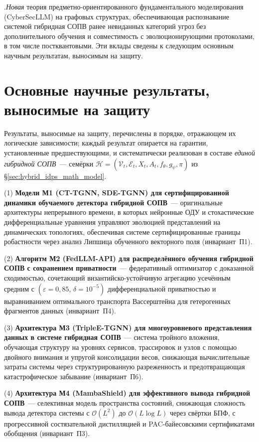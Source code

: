 .\quad \emph{Новая} теория предметно-ориентированного
фундаментального моделирования (CyberSecLLM) на графовых структурах,
обеспечивающая распознавание системой гибридная СОПВ ранее невиданных
категорий угроз без дополнительного обучения и совместимость с
эволюционирующими протоколами, в том числе постквантовыми. Эти
вклады сведены к следующим основным научным результатам, выносимым
на защиту.

\section*{Основные научные результаты, выносимые на защиту}

Результаты, выносимые на защиту, перечислены в порядке, отражающем
их логические зависимости; каждый результат опирается на гарантии,
установленные предшествующими, и систематически реализован в
составе \emph{единой гибридной СОПВ}~--- семёрки
$\mathcal{H}=(\mathcal{V}_t,\mathcal{E}_t,X_t,A_t,f_\theta,g_\psi,\pi)$
из \S\ref{sec:hybrid_idps_math_model}.

(1) \textbf{Модели М1 (CT-TGNN, SDE-TGNN) для сертифицированной
динамики обучаемого детектора гибридной СОПВ}~--- оригинальные
архитектуры непрерывного времени, в которых нейронные ОДУ и
стохастические дифференциальные уравнения управляют эволюцией
представлений на динамических топологиях, обеспечивая системе
сертифицированные границы робастности через анализ Липшица
обученного векторного поля (инвариант~П1).

(2) \textbf{Алгоритм М2 (FedLLM-API) для распределённого обучения
гибридной СОПВ с сохранением приватности}~--- федеративный
оптимизатор с доказанной сходимостью, сочетающий византийско-устойчивую
агрегацию усечённым средним с $(\varepsilon{=}0{,}85,\,\delta{=}10^{-5})$
дифференциальной приватностью и выравниванием оптимального транспорта
Вассерштейна для гетерогенных фрагментов данных (инвариант~П4).

(3) \textbf{Архитектура М3 (TripleE-TGNN) для многоуровневого
представления данных в системе гибридная СОПВ}~--- система тройного
вложения, обучающая структуру на уровнях сервисов, трассировок и
узлов с помощью двойного внимания и упругой консолидации весов,
снижающая вычислительные затраты системы через структурированную
разреженность и предотвращающая катастрофическое забывание
(инвариант~П6).

(4) \textbf{Архитектура М4 (MambaShield) для эффективного вывода
гибридной СОПВ}~--- селективная модель пространства состояний,
снижающая сложность вывода детектора системы с $\mathcal{O}(L^{2})$
до $\mathcal{O}(L\log L)$ через свёртки БПФ, с прогрессивной
состязательной дистилляцией и PAC-байесовскими сертификатами
обобщения (инвариант~П3).

